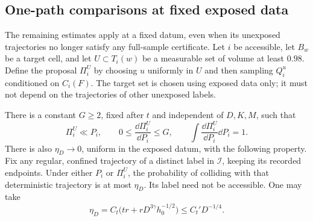 \subsection{One-path comparisons at fixed exposed data}

The remaining estimates apply at a fixed datum, even when its
unexposed trajectories no longer satisfy any full-sample certificate.
Let $i$ be accessible, let $B_w$ be a target cell, and let
$U\subset T_i(w)$ be a measurable set of volume at least $0.98$.
Define the proposal $\Pi_i^U$ by choosing $u$ uniformly in $U$ and
then sampling $Q_i^u$ conditioned on $C_i(F)$.  The target set is
chosen using exposed data only; it must not depend on the trajectories
of other unexposed labels.

\begin{proposition}
\label{group:comparison}
There is a constant $G\ge2$, fixed after $t$ and independent of $D,K,M$,
such that
\begin{equation}\label{group:density-bound}
 \Pi_i^U\ll P_i,\qquad
 0\le\frac{\dd\Pi_i^U}{\dd P_i}\le G,
 \qquad \int\frac{\dd\Pi_i^U}{\dd P_i}\dd P_i=1.
\end{equation}
There is also $\eta_D\to0$, uniform in the exposed datum, with the
following property.  Fix any regular, confined trajectory of a distinct
label in $\mathcal I$, keeping its recorded endpoints.  Under either
$P_i$ or $\Pi_i^U$, the probability of colliding with that deterministic
trajectory is at most $\eta_D$.  Its label need not be accessible.
One may take
\begin{equation}\label{group:eta}
 \eta_D=C_t\bigl(tr+rD^{3\gamma}h_0^{-1/2}\bigr)
 \le C_t' D^{-1/4}.
\end{equation}
\end{proposition}

